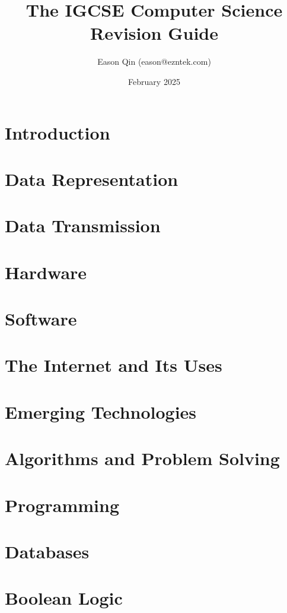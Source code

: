 \documentclass[a4paper, oneside, 11pt]{book} %
\title{The IGCSE Computer Science Revision Guide}
\author{Eason Qin (eason@ezntek.com)}
\date{February 2025}
\begin{document}
\maketitle
\label{table-of-contents}
\tableofcontents

\chapter*{Introduction}
\label{introduction}


\chapter{Data Representation}


\chapter{Data Transmission}


\chapter{Hardware}


\chapter{Software}


\chapter{The Internet and Its Uses}


\chapter{Emerging Technologies}


\chapter{Algorithms and Problem Solving}


\chapter{Programming}


\chapter{Databases}


\chapter{Boolean Logic}

\end{document}
